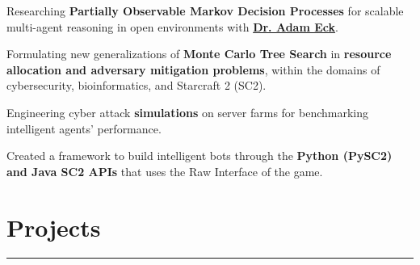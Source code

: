 \documentclass[]{dafirebanks-resume-openfont}
\begin{document}
\begin{minipage}[t]{0.66\textwidth}
\hspace{160pt}
\begin{tightemize}
	\item  Researching \textbf{Partially Observable Markov Decision Processes} for scalable multi-agent reasoning in open environments with \textbf{\href{http://www.cs.oberlin.edu/~aeck/}{Dr. Adam Eck}}.
	\item Formulating new generalizations of \textbf{Monte Carlo Tree Search} in \textbf{resource allocation and adversary mitigation problems}, within the domains of cybersecurity, bioinformatics, and Starcraft 2 (SC2).
	\item Engineering cyber attack \textbf{simulations} on server farms for benchmarking intelligent agents' performance.
	\item Created a framework to build intelligent bots through the \textbf{Python (PySC2) and Java SC2 APIs} that uses the Raw Interface of the game. 
\end{tightemize}
\sectionsep





\section{Projects}
\vspace{-3pt}
{\color{blue}\hrule} \vspace{5pt}


\end{minipage}
\end{document}
